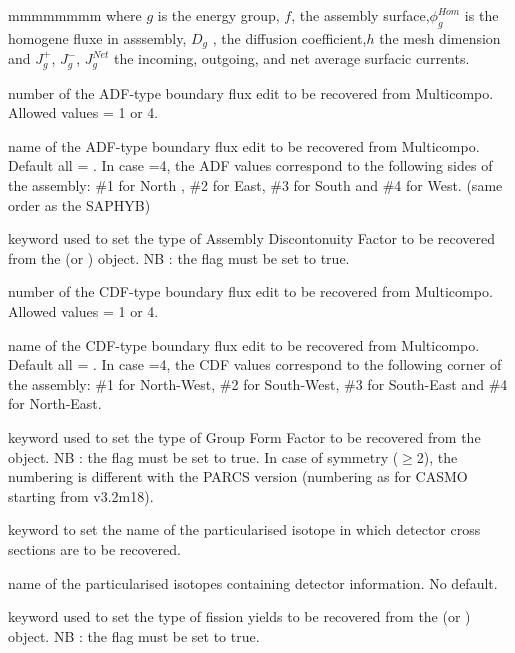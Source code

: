 \begin{ListeDeDescription}{mmmmmmmm}
where $g$ is the energy group, $f$, the assembly surface,$\phi _{g}^{Hom}$ is the homogene fluxe in asssembly, $D _{g}$ , the diffusion coefficient,$h$ the  mesh dimension and $J _{g}^{+}$, $J _{g}^{-}$, $J _{g}^{Net}$ the incoming, outgoing, and net average surfacic currents. 

\item[\dusa{nadf}] number of the ADF-type boundary flux edit to be recovered from Multicompo. Allowed values  = 1 or 4.

\item[\dusa{hadf}] name of the ADF-type boundary flux edit to be recovered from Multicompo. Default all  = . In case =4, the ADF values correspond to the following sides of the assembly: \#1 for North , \#2 for East, \#3 for South  and \#4 for West. (same order as the SAPHYB)

\item[\moc{CDF}] keyword used to set the type of Assembly Discontonuity Factor to be recovered from the  (or )   object. NB : the  flag must be set to true. 

\item[\dusa{ncdf}] number of the CDF-type boundary flux edit to be recovered from Multicompo. Allowed values  = 1 or 4.

\item[\dusa{hcdf}] name of the CDF-type boundary flux edit to be recovered from Multicompo. Default all  = . In case =4, the CDF values correspond to the following corner of the assembly: \#1 for North-West, \#2 for South-West, \#3 for South-East and \#4 for North-East.

\item[\moc{GFF}] keyword used to set the type of Group Form Factor to be recovered from the   object. NB : the  flag must be set to true. In case of symmetry ($\ge$2), the numbering is different with the PARCS version (numbering as for CASMO starting from v3.2m18). 

\item[\moc{DET}] keyword to set the name of the particularised isotope in which detector cross sections are to be recovered. 

\item[\dusa{hdet}] name of the particularised isotopes containing detector information. No default. 

\item[\moc{YLD}] keyword used to set the type of fission yields to be recovered from the  (or )   object. NB : the  flag must be set to true.


\end{ListeDeDescription}
